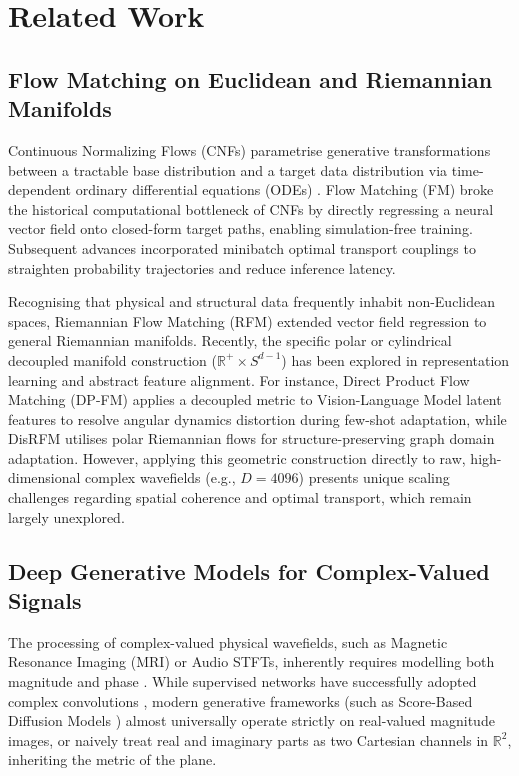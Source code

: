 \section{Related Work}
\label{sec:related_work}

\subsection{Flow Matching on Euclidean and Riemannian Manifolds}
\label{sec:rel_flow}
Continuous Normalizing Flows (CNFs) parametrise generative transformations between a tractable base distribution and a target data distribution via time-dependent ordinary differential equations (ODEs) \citep{chen2018neural}. Flow Matching (FM) \citep{lipman2023flow, albergo2023building, liu2023flow} broke the historical computational bottleneck of CNFs by directly regressing a neural vector field onto closed-form target paths, enabling simulation-free training. Subsequent advances incorporated minibatch optimal transport couplings \citep{pooladian2023multisample, tong2023improving} to straighten probability trajectories and reduce inference latency.

Recognising that physical and structural data frequently inhabit non-Euclidean spaces, Riemannian Flow Matching (RFM) \citep{chen2024flow} extended vector field regression to general Riemannian manifolds. Recently, the specific polar or cylindrical decoupled manifold construction ($\mathbb{R}^+ \times S^{d-1}$) has been explored in representation learning and abstract feature alignment. For instance, Direct Product Flow Matching (DP-FM) \citep{chen2026dpfm} applies a decoupled metric to Vision-Language Model latent features to resolve angular dynamics distortion during few-shot adaptation, while DisRFM \citep{wang2026disrfm} utilises polar Riemannian flows for structure-preserving graph domain adaptation. However, applying this geometric construction directly to raw, high-dimensional complex wavefields (e.g., $D=4096$) presents unique scaling challenges regarding spatial coherence and optimal transport, which remain largely unexplored.

\subsection{Deep Generative Models for Complex-Valued Signals}
\label{sec:rel_mri}
The processing of complex-valued physical wavefields, such as Magnetic Resonance Imaging (MRI) or Audio STFTs, inherently requires modelling both magnitude and phase \citep{bernstein2004handbook, trabelsi2018deep}. While supervised networks have successfully adopted complex convolutions \citep{cole2021analysis}, modern generative frameworks (such as Score-Based Diffusion Models \citep{song2020score, chung2022score}) almost universally operate strictly on real-valued magnitude images, or naively treat real and imaginary parts as two Cartesian channels in $\mathbb{R}^2$, inheriting the metric of the plane.


